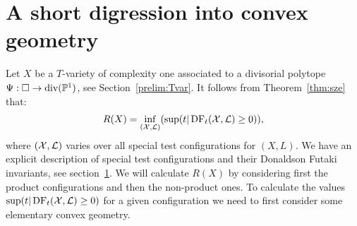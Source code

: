 \section{A short digression into convex geometry}
Let \(X\) be a \(T\)-variety of complexity one associated to a divisorial polytope \(\Psi: \Box \to \text{div}(\mathbb{P}^1)\), see Section~\ref{prelim:Tvar}.
It follows from Theorem~\ref{thm:sze} that:
\begin{align*}
R(X) = \inf_{({\mathcal{X}},\mathcal{L})}( \sup(t | \mathop{\rm DF}\nolimits_t({\mathcal{X}},\mathcal{L}) \ge 0) ),
\end{align*}
where \(({\mathcal{X}},\mathcal{L})\) varies over all special test configurations for \((X,L)\). We have an explicit description of special test configurations and their Donaldson Futaki invariants, see section~\ref{}. We will calculate \(R(X)\) by considering first the product configurations and then the non-product ones. To calculate the values \(\sup(t | \mathop{\rm DF}\nolimits_t({\mathcal{X}},\mathcal{L}) \ge 0)\) for a given configuration we need to first consider some elementary convex geometry.

